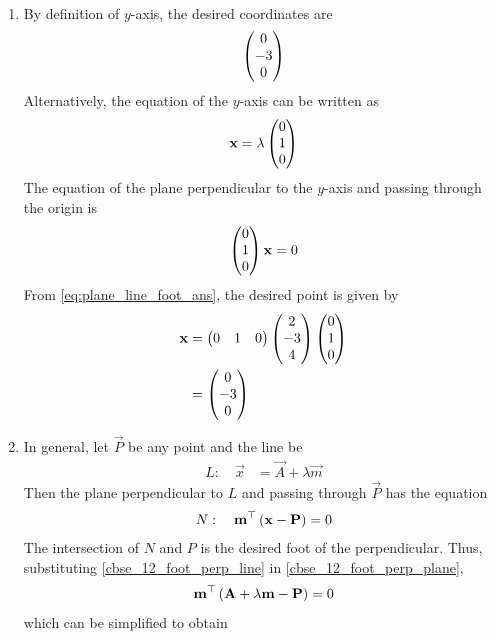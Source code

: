 \documentclass[journal,12pt,twocolumn]{IEEEtran}
\renewcommand\thesection{\arabic{section}}
\begin{document}
\begin{enumerate}[label=\thesection.\arabic*.,ref=\thesection.\theenumi]
		\\
\solution 
		\begin{enumerate}
			\item 		By definition of $y$-axis, the desired coordinates are 
		\begin{align}
			\begin{pmatrix}0 \\ -3 \\ 0\end{pmatrix} 
		\end{align}
	Alternatively, the equation of the $y$-axis can be written as	
		\begin{align}
			\mathbf{x} = \lambda 	\begin{pmatrix}0 \\ 1 \\ 0\end{pmatrix} 
		\end{align}
		The equation of the plane perpendicular to the $y$-axis and passing through the origin is
		\begin{align}
 	\begin{pmatrix}0 \\ 1 \\ 0\end{pmatrix} \mathbf{x} = 0
		\end{align}
	From \eqref{eq:plane_line_foot_ans},  the desired point is given by 
\begin{align}
	\mathbf{x} &=   \begin{pmatrix}0 & 1 & 0\end{pmatrix}\begin{pmatrix}2 \\-3 \\4 \end{pmatrix} 
 \begin{pmatrix}0 \\ 1 \\ 0\end{pmatrix} 
 \\
	&=
 \begin{pmatrix}0 \\ -3 \\ 0\end{pmatrix} 
		\end{align}
	\item In general, let $\vec{P}$ be any point and the line be
\begin{align}
	\label{cbse_12_foot_perp_line}
	L: \quad	\vec{x} &=  \vec{A} + \lambda \vec{m}
		\end{align}
				Then the plane perpendicular to $L$ and passing through $\vec{P}$ has the equation 
\begin{align}
	\label{cbse_12_foot_perp_plane}
	N: \quad	\mathbf{m}^{\top}\left(\mathbf{x} -  \mathbf{P}\right) = 0 
		\end{align}
		The intersection of $N$ and $P$ is the desired foot of the perpendicular.  Thus, substituting
	\eqref{cbse_12_foot_perp_line} in 
	\eqref{cbse_12_foot_perp_plane}, 
\begin{align}
\mathbf{m}^{\top}\left(\mathbf{A} + \lambda \mathbf{m} -  \mathbf{P}\right) = 0 
		\end{align}
		which can be simplified to obtain 
\begin{align}

\end{align}
\end{enumerate}
\end{enumerate}
\end{document}
